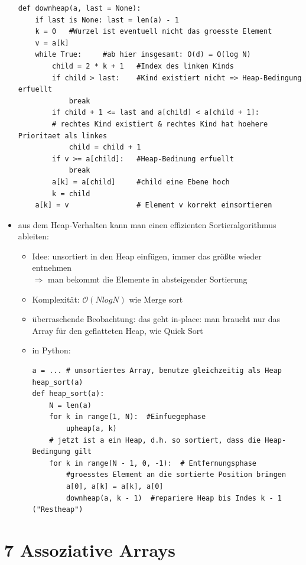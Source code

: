 \documentclass[11pt, fleqn]{scrreprt}
\newcommand{\bigO}[0]{\mathcal{O}}
\begin{document}
\begin{itemize}
\begin{verbatim}
def downheap(a, last = None):
    if last is None: last = len(a) - 1
    k = 0   #Wurzel ist eventuell nicht das groesste Element
    v = a[k]
    while True:     #ab hier insgesamt: O(d) = O(log N)
        child = 2 * k + 1   #Index des linken Kinds
        if child > last:    #Kind existiert nicht => Heap-Bedingung erfuellt
            break
        if child + 1 <= last and a[child] < a[child + 1]:
        # rechtes Kind existiert & rechtes Kind hat hoehere Prioritaet als linkes
            child = child + 1
        if v >= a[child]:   #Heap-Bedinung erfuellt
            break
        a[k] = a[child]     #child eine Ebene hoch
        k = child
    a[k] = v                # Element v korrekt einsortieren
        \end{verbatim}
        \item aus dem Heap-Verhalten kann man einen effizienten Sortieralgorithmus ableiten:
        \begin{itemize}
            \item Idee: unsortiert in den Heap einfügen, immer das größte wieder entnehmen\\
            $\Rightarrow$ man bekommt die Elemente in absteigender Sortierung
            \item Komplexität: $\bigO{}(N log N)$ wie Merge sort
            \item überraschende Beobachtung: das geht in-place: man braucht nur das Array für den geflatteten Heap, wie Quick Sort
            \item in Python:
            \begin{verbatim}
a = ... # unsortiertes Array, benutze gleichzeitig als Heap
heap_sort(a)
def heap_sort(a):
    N = len(a)
    for k in range(1, N):  #Einfuegephase
        upheap(a, k)
    # jetzt ist a ein Heap, d.h. so sortiert, dass die Heap-Bedingung gilt
    for k in range(N - 1, 0, -1):  # Entfernungsphase
        #groesstes Element an die sortierte Position bringen
        a[0], a[k] = a[k], a[0]
        downheap(a, k - 1)  #repariere Heap bis Indes k - 1 ("Restheap")
            \end{verbatim}
        \end{itemize}
\end{itemize}

\chapter*{7 Assoziative Arrays}
\end{document}
